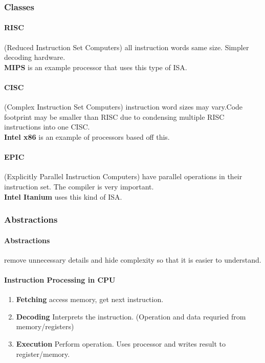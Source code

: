 \documentclass{article}
\newcommand\tab[1][0.5cm]{\hspace*{#1}}
\begin{document}
		\subsubsection{Classes}
			\paragraph{RISC} (Reduced Instruction Set Computers) all instruction words same size. Simpler decoding hardware. 
			\\ \tab \textbf{MIPS} is an example processor that uses this type of ISA.

			\paragraph{CISC} (Complex Instruction Set Computers) instruction word sizes may vary.Code footprint may be smaller than RISC due to condensing multiple RISC instructions into one CISC. 
			\\ \tab \textbf{Intel x86} is an example of processors based off this.

			\paragraph{EPIC} (Explicitly Parallel Instruction Computers) have parallel operations in their instruction set. The compiler is very important.
			\\ \tab \textbf{Intel Itanium} uses this kind of ISA.

		\subsubsection{Abstractions}
			\paragraph{Abstractions} remove unnecessary details and hide complexity so that it is easier to understand. 

			\paragraph{\tab Instruction Processing in CPU}
			\begin{enumerate}
				\item \textbf{Fetching} access memory, get next instruction.
				\item \textbf{Decoding} Interprets the instruction. (Operation and data requried from memory/registers)
				\item \textbf{Execution} Perform operation. Uses processor and writes result to register/memory.
			\end{enumerate}
\end{document}
